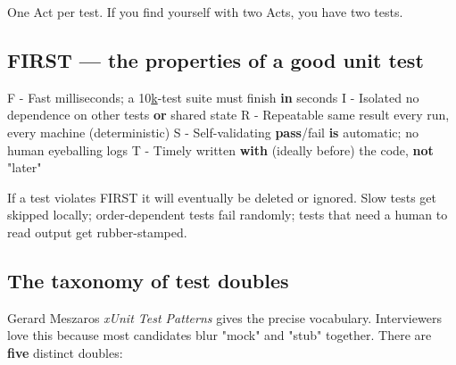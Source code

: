 \documentclass[11pt]{article}
\newenvironment{Shaded}{\begin{snugshade}}{\end{snugshade}}
\newcommand{\ControlFlowTok}[1]{\textcolor[rgb]{0.99,0.74,0.29}{\textbf{#1}}}
\newcommand{\DecValTok}[1]{\textcolor[rgb]{0.96,0.45,0.00}{#1}}
\newcommand{\ErrorTok}[1]{\textcolor[rgb]{0.85,0.27,0.33}{\underline{#1}}}
\newcommand{\KeywordTok}[1]{\textcolor[rgb]{0.81,0.81,0.76}{\textbf{#1}}}
\newcommand{\NormalTok}[1]{\textcolor[rgb]{0.81,0.81,0.76}{#1}}
\newcommand{\OperatorTok}[1]{\textcolor[rgb]{0.81,0.81,0.76}{#1}}
\newcommand{\StringTok}[1]{\textcolor[rgb]{0.96,0.31,0.31}{#1}}
\begin{document}
One Act per test. If you find yourself with two Acts, you have two tests.

\subsection{FIRST --- the properties of a good unit test}\label{first--the-properties-of-a-good-unit-test}


\begin{Shaded}
\begin{Highlighting}[]
\NormalTok{   F }\OperatorTok{{-}}\NormalTok{ Fast        milliseconds}\OperatorTok{;}\NormalTok{ a }\DecValTok{10}\ErrorTok{k}\OperatorTok{{-}}\NormalTok{test suite must finish }\KeywordTok{in}\NormalTok{ seconds}
\NormalTok{   I }\OperatorTok{{-}}\NormalTok{ Isolated    no dependence on other tests }\KeywordTok{or}\NormalTok{ shared state}
\NormalTok{   R }\OperatorTok{{-}}\NormalTok{ Repeatable  same result every run, every machine (deterministic)}
\NormalTok{   S }\OperatorTok{{-}}\NormalTok{ Self}\OperatorTok{{-}}\NormalTok{validating  }\ControlFlowTok{pass}\OperatorTok{/}\NormalTok{fail }\KeywordTok{is}\NormalTok{ automatic}\OperatorTok{;}\NormalTok{ no human eyeballing logs}
\NormalTok{   T }\OperatorTok{{-}}\NormalTok{ Timely       written }\ControlFlowTok{with}\NormalTok{ (ideally before) the code, }\KeywordTok{not} \StringTok{"later"}
\end{Highlighting}
\end{Shaded}

If a test violates FIRST it will eventually be deleted or ignored. Slow tests get skipped locally; order-dependent tests fail randomly; tests that need a human to read output get rubber-stamped.

\subsection{The taxonomy of test doubles}\label{the-taxonomy-of-test-doubles}

Gerard Meszaros\textquotesingle{} \emph{xUnit Test Patterns} gives the precise vocabulary. Interviewers love this because most candidates blur "mock" and "stub" together. There are \textbf{five} distinct doubles:
\end{document}
